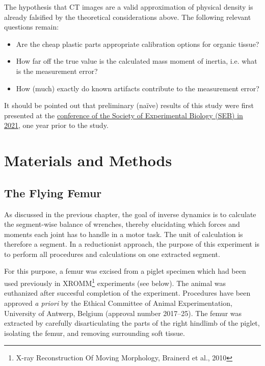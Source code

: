 The hypothesis that CT images are a valid approximation of physical density is already falsified by the theoretical considerations above.
The following relevant questions remain:
\begin{itemize}
\item Are the cheap plastic parts appropriate calibration options for organic tissue?
\item How far off the true value is the calculated mass moment of inertia, i.e. what is the measurement error?
\item How (much) exactly do known artifacts contribute to the measurement error?
\end{itemize}


It should be pointed out that preliminary (naïve) results of this study were first presented at the \href{http://mielke-bio.info/falk/posts/26.seb2021}{conference of the Society of Experimental Biology (SEB) in 2021}, one year prior to the \citet{Durston2022} study.




\section{Materials and Methods}
\label{sec:orgcefcf9b}
\subsection{The Flying Femur}
\label{sec:org9fce98d}

As discussed in the previous chapter, the goal of inverse dynamics is to calculate the segment-wise balance of wrenches, thereby elucidating which forces and moments each joint has to handle in a motor task.
The unit of calculation is therefore a segment.
In a reductionist approach, the purpose of this experiment is to perform all procedures and calculations on one extracted segment.

For this purpose, a femur was excised from a piglet specimen which had been used previously in XROMM\footnote{X-ray Reconstruction Of Moving Morphology, Brainerd et al., 2010} experiments (see below). \nocite{Brainerd2010}
The animal was euthanized after succesful completion of the experiment.
Procedures have been approved \emph{a priori} by the Ethical Committee of Animal Experimentation, University of Antwerp, Belgium (approval number 2017–25).
The femur was extracted by carefully disarticulating the parts of the right hindlimb of the piglet, isolating the femur, and removing surrounding soft tissue.

